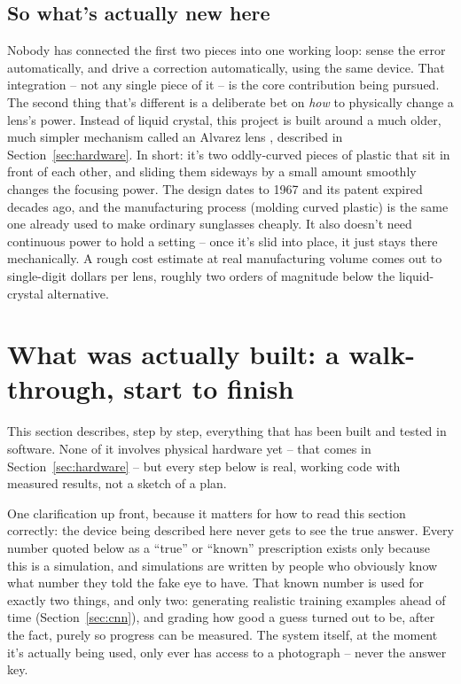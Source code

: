 \documentclass[11pt]{article}
\begin{document}
\subsection{So what's actually new here}
Nobody has connected the first two pieces into one working loop: sense the error automatically, and drive a correction automatically, using the same device. That integration -- not any single piece of it -- is the core contribution being pursued. The second thing that's different is a deliberate bet on \emph{how} to physically change a lens's power. Instead of liquid crystal, this project is built around a much older, much simpler mechanism called an Alvarez lens \cite{alvarez1967, barbero2011}, described in Section~\ref{sec:hardware}. In short: it's two oddly-curved pieces of plastic that sit in front of each other, and sliding them sideways by a small amount smoothly changes the focusing power. The design dates to 1967 and its patent expired decades ago, and the manufacturing process (molding curved plastic) is the same one already used to make ordinary sunglasses cheaply. It also doesn't need continuous power to hold a setting -- once it's slid into place, it just stays there mechanically. A rough cost estimate at real manufacturing volume comes out to single-digit dollars per lens, roughly two orders of magnitude below the liquid-crystal alternative.

\section{What was actually built: a walk-through, start to finish}

This section describes, step by step, everything that has been built and tested in software. None of it involves physical hardware yet -- that comes in Section~\ref{sec:hardware} -- but every step below is real, working code with measured results, not a sketch of a plan.

One clarification up front, because it matters for how to read this section correctly: the device being described here never gets to see the true answer. Every number quoted below as a ``true'' or ``known'' prescription exists only because this is a simulation, and simulations are written by people who obviously know what number they told the fake eye to have. That known number is used for exactly two things, and only two: generating realistic training examples ahead of time (Section~\ref{sec:cnn}), and grading how good a guess turned out to be, after the fact, purely so progress can be measured. The system itself, at the moment it's actually being used, only ever has access to a photograph -- never the answer key.
\end{document}
